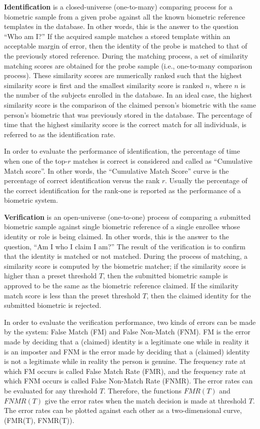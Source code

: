 \bi
\item\textbf{Identification} is a closed-universe (one-to-many) comparing process
for a biometric sample from a given probe against all the known
biometric reference templates in the database. In other words, this
is the answer to the question ``Who am I?'' If the acquired sample
matches a stored template within an acceptable margin of error, then
the identity of the probe is matched to that of the previously
stored reference. During the matching process, a set of similarity
matching scores are obtained for the probe sample (i.e., one-to-many
comparison process). These similarity scores are numerically ranked
such that the highest similarity score is first and the smallest
similarity score is ranked $n$, where $n$ is the number of the
subjects enrolled in the database. In an ideal case, the highest
similarity score is the comparison of the claimed person's biometric
with the same person's biometric that was previously stored in the
database. The percentage of time that the highest similarity score
is the correct match for all individuals, is referred to as the
identification rate.

In order to evaluate the performance of identification, the
percentage of time when one of the top-$r$ matches is correct is
considered and called as ``Cumulative Match score''. In other words,
the ``Cumulative Match Score'' curve is the percentage of correct
identification versus the rank $r$. Usually the percentage of the
correct identification for the rank-one is reported as the
performance of a biometric system.

\item \textbf{Verification} is an open-universe (one-to-one) process of comparing a
submitted biometric sample against single biometric reference of a
single enrollee whose identity or role is being claimed. In other
words, this is the answer to the question, ``Am I who I claim I
am?'' The result of the verification is to confirm that the identity
is matched or not matched. During the process of matching, a
similarity score is computed by the biometric matcher; if the
similarity score is higher than a preset threshold $T$, then the
submitted biometric sample is approved to be the same as the
biometric reference claimed. If the similarity match score is less
than the preset threshold $T$, then the claimed identity for the
submitted biometric is rejected.

In order to evaluate the verification performance, two kinds of
errors can be made by the system: False Match (FM) and False
Non-Match (FNM). FM is the error made by deciding that a (claimed)
identity is a legitimate one while in reality it is an imposter and
FNM is the error made by deciding that a (claimed) identity is not a
legitimate while in reality the person is genuine. The frequency
rate at which FM occurs is called False Match Rate (FMR), and the
frequency rate at which FNM occurs is called False Non-Match Rate
(FNMR). The error rates can be evaluated for any threshold $T$.
Therefore, the functions $FMR(T)$ and $FNMR(T)$ give the error rates
when the match decision is made at threshold $T$. The error rates
can be plotted against each other as a two-dimensional curve,
(FMR(T), FNMR(T)).


